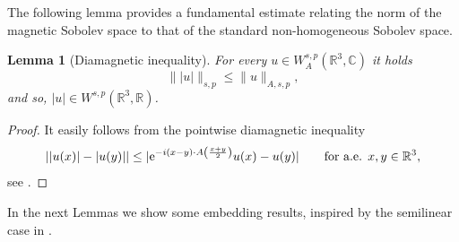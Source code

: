 \documentclass[leqno,11pt]{amsart}
\newcommand{\R}{\mathbb R}
\newcommand{\CC}{\mathbb C}
\numberwithin{equation}{section}
\newtheorem{lemma}[theorem]{Lemma}
\def\e{{\rm e}}
\newcommand{\expAminus}{\e^{-i(x-y)\cdot A\left(\frac{x+y}{2}\right)}}
\begin{document}
The following lemma provides a fundamental estimate relating the norm of the magnetic Sobolev space to that of the standard non-homogeneous Sobolev space.

\begin{lemma}[Diamagnetic inequality]\label{lem:diam}
    For every $u \in W^{s,p}_A(\R^3,\CC)$ it holds 
    \begin{equation}
        \||u|\|_{s,p} \leq \|u\|_{A,s,p},
    \end{equation}
    and so, $|u| \in W^{s,p}(\R^3,\R)$.
\end{lemma}
\begin{proof}
It easily follows from the pointwise diamagnetic inequality
$$||u(x)|-|u(y)||\le |\expAminus u(x)- u(y)|\qquad \text{for a.e. $x,y\in \R^3$},$$
see \cite[Remark 3.2]{dAveniaSquassina}.
\end{proof}




In the next Lemmas we show some embedding results, inspired by the semilinear case in \cite{dAveniaSquassina}.
\end{document}
